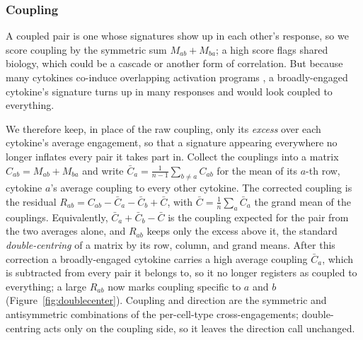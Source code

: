 \documentclass[11pt,a4paper]{article}
\newcommand{\rev}[1]{#1}  %
\begin{document}
\subsubsection{Coupling}
A coupled pair is one whose signatures show up in each other's response, so we score coupling by the symmetric sum $M_{ab}+M_{ba}$; a high score flags shared biology, which could be a cascade or another form of correlation.
But because many cytokines co-induce overlapping activation programs \citep{der1998identification,baysoy2023interweaved,mostafavi2016interferon,jenner2005insights,xue2014spectrum}, a broadly-engaged cytokine's signature turns up in many responses and would look coupled to everything.

\rev{We therefore keep, in place of the raw coupling, only its \emph{excess} over each cytokine's average engagement, so that a signature appearing everywhere no longer inflates every pair it takes part in.}
\rev{Collect the couplings into a matrix $C_{ab}=M_{ab}+M_{ba}$ and write $\bar C_a=\frac{1}{n-1}\sum_{b\ne a}C_{ab}$ for the mean of its $a$-th row, cytokine $a$'s average coupling to every other cytokine.}
\rev{The corrected coupling is the residual $R_{ab}=C_{ab}-\bar C_a-\bar C_b+\bar C$, with $\bar C=\frac{1}{n}\sum_a \bar C_a$ the grand mean of the couplings.}
\rev{Equivalently, $\bar C_a+\bar C_b-\bar C$ is the coupling expected for the pair from the two averages alone, and $R_{ab}$ keeps only the excess above it, the standard \emph{double-centring} of a matrix by its row, column, and grand means.}
\rev{After this correction a broadly-engaged cytokine carries a high average coupling $\bar C_a$, which is subtracted from every pair it belongs to, so it no longer registers as coupled to everything; a large $R_{ab}$ now marks coupling specific to $a$ and $b$ (Figure~\ref{fig:doublecenter}).}
\rev{Coupling and direction are the symmetric and antisymmetric combinations of the per-cell-type cross-engagements; double-centring acts only on the coupling side, so it leaves the direction call unchanged.}
\end{document}
